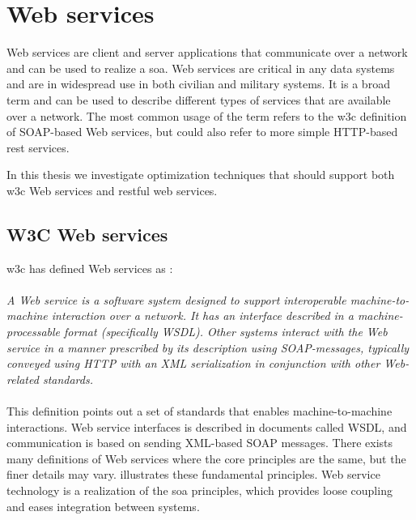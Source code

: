 \section{Web services}
\label{web-services}
Web services are client and server applications that communicate over a network
and can be used to realize a \gls{soa}. Web services are critical in any data
systems and are in widespread use in both civilian and military systems. It is a
broad term and can be used to describe different types of services that are
available over a network. The most common usage of the term refers to the
\gls{w3c} definition of SOAP-based Web services, but could also refer to more
simple HTTP-based \gls{rest} services.

In this thesis we investigate optimization techniques that should support both
\gls{w3c} Web services and \gls{rest}ful web services.

\subsection{W3C Web services}

\gls{w3c} has defined Web services as \cite{wrc-web-service}:

\paragraph{}
\textit{
    A Web service is a software system designed to support interoperable
    machine-to-machine interaction over a network. It has an interface described in
    a machine-processable format (specifically WSDL). Other systems interact with
    the Web service in a manner prescribed by its description using SOAP-messages,
    typically conveyed using HTTP with an XML serialization in conjunction with
    other Web-related standards.
}

\paragraph{}

This definition points out a set of standards that enables machine-to-machine
interactions. Web service interfaces is described in documents called WSDL, and
communication is based on sending XML-based SOAP messages. There exists many
definitions of Web services where the core principles are the same, but the
finer details may vary.  illustrates these
fundamental principles. Web service technology is a realization of the \gls{soa}
principles, which provides loose coupling and eases integration between systems.


